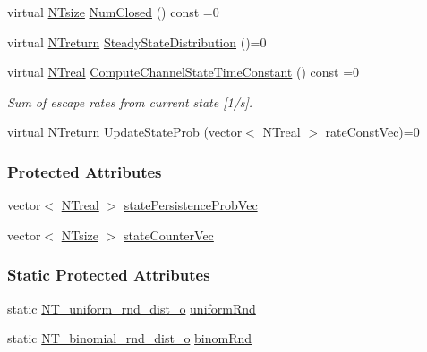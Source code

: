 \begin{DoxyCompactItemize}
\item 
virtual \hyperlink{nt__types_8h_a06c124f2e4469769b58230253ce0560b}{NTsize} \hyperlink{class_n_t_b_p__ion__channels__o_aa50f6de73c29f82ed85136d6f32eb4b9}{NumClosed} () const =0
\item 
virtual \hyperlink{nt__types_8h_ab9564ee8f091e809d21b8451c6683c53}{NTreturn} \hyperlink{class_n_t_b_p__ion__channels__o_a6af9a67869bbbb43b9ec5bd28beff681}{SteadyStateDistribution} ()=0
\item 
virtual \hyperlink{nt__types_8h_a814a97893e9deb1eedcc7604529ba80d}{NTreal} \hyperlink{class_n_t_b_p__ion__channels__o_adc3430ac3f77ed8f01f4a7041a912246}{ComputeChannelStateTimeConstant} () const =0
\begin{DoxyCompactList}\small\item\em Sum of escape rates from current state \mbox{[}1/s\mbox{]}. \item\end{DoxyCompactList}\item 
virtual \hyperlink{nt__types_8h_ab9564ee8f091e809d21b8451c6683c53}{NTreturn} \hyperlink{class_n_t_b_p__ion__channels__o_a6c865e74014bef8bc9ae547e4835ec81}{UpdateStateProb} (vector$<$ \hyperlink{nt__types_8h_a814a97893e9deb1eedcc7604529ba80d}{NTreal} $>$ rateConstVec)=0
\end{DoxyCompactItemize}
\subsubsection*{Protected Attributes}
\begin{DoxyCompactItemize}
\item 
vector$<$ \hyperlink{nt__types_8h_a814a97893e9deb1eedcc7604529ba80d}{NTreal} $>$ \hyperlink{class_n_t_b_p__ion__channels__o_a794757763f5dc40dc3f3336e96e30c0c}{statePersistenceProbVec}
\item 
vector$<$ \hyperlink{nt__types_8h_a06c124f2e4469769b58230253ce0560b}{NTsize} $>$ \hyperlink{class_n_t_b_p__ion__channels__o_a2a06cae230e79c0548210d704fdab042}{stateCounterVec}
\end{DoxyCompactItemize}
\subsubsection*{Static Protected Attributes}
\begin{DoxyCompactItemize}
\item 
static \hyperlink{class_n_t__uniform__rnd__dist__o}{NT\_\-uniform\_\-rnd\_\-dist\_\-o} \hyperlink{class_n_t_b_p__ion__channels__o_a4739d0046a028f8484d0d8948f9cd5be}{uniformRnd}
\item 
static \hyperlink{class_n_t__binomial__rnd__dist__o}{NT\_\-binomial\_\-rnd\_\-dist\_\-o} \hyperlink{class_n_t_b_p__ion__channels__o_a624ace6b6ed786eae71b2833c4d8e7a4}{binomRnd}
\end{DoxyCompactItemize}



